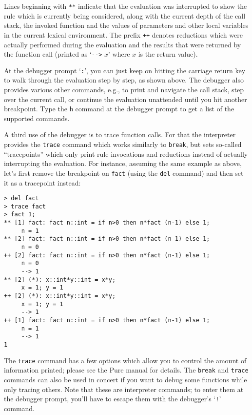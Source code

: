 \documentclass[a4paper,12pt]{article}
\begin{document}
Lines beginning with \verb|**| indicate that the evaluation was interrupted to show the rule which is currently being considered, along with the current depth of the call stack, the invoked function and the values of parameters and other local variables in the current lexical environment. The prefix \verb|++| denotes reductions which were actually performed during the evaluation and the results that were returned by the function call (printed as `\verb|-->| $x$' where $x$ is the return value).

At the debugger prompt `\verb|:|', you can just keep on hitting the carriage return key to walk through the evaluation step by step, as shown above. The debugger also provides various other commands, e.g., to print and navigate the call stack, step over the current call, or continue the evaluation unattended until you hit another breakpoint. Type the \verb|h| command at the debugger prompt to get a list of the supported commands.

A third use of the debugger is to trace function calls. For that the interpreter provides the \texttt{trace} command which works similarly to \texttt{break}, but sets so-called ``tracepoints'' which only print rule invocations and reductions instead of actually interrupting the evaluation. For instance, assuming the same example as above, let's first remove the breakpoint on \texttt{fact} (using the \texttt{del} command) and then set it as a tracepoint instead:

\begin{lstlisting}
> del fact
> trace fact
> fact 1;
** [1] fact: fact n::int = if n>0 then n*fact (n-1) else 1;
     n = 1
** [2] fact: fact n::int = if n>0 then n*fact (n-1) else 1;
     n = 0
++ [2] fact: fact n::int = if n>0 then n*fact (n-1) else 1;
     n = 0
     --> 1
** [2] (*): x::int*y::int = x*y;
     x = 1; y = 1
++ [2] (*): x::int*y::int = x*y;
     x = 1; y = 1
     --> 1
++ [1] fact: fact n::int = if n>0 then n*fact (n-1) else 1;
     n = 1
     --> 1
1
\end{lstlisting}

The \texttt{trace} command has a few options which allow you to control the amount of information printed; please see the Pure manual for details. The \texttt{break} and \texttt{trace} commands can also be used in concert if you want to debug some functions while only tracing others. Note that these are interpreter commands; to enter them at the debugger prompt, you'll have to escape them with the debugger's `\verb|!|' command.
\end{document}
